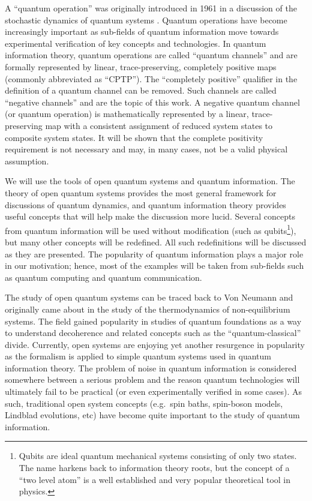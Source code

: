A ``quantum operation'' was originally introduced in 1961 in a discussion of the stochastic dynamics of quantum systems \cite{Sudarshan1961}.  Quantum operations have become increasingly important as sub-fields of quantum information move towards experimental verification of key concepts and technologies.  In quantum information theory, quantum operations are called ``quantum channels'' and are formally represented by linear, trace-preserving, completely positive maps (commonly abbreviated as ``CPTP'').  The ``completely positive'' qualifier in the definition of a quantum channel can be removed.  Such channels are called ``negative channels'' and are the topic of this work.  A negative quantum channel (or quantum operation) is mathematically represented by a linear, trace-preserving map with a consistent assignment of reduced system states to composite system states.  It will be shown that the complete positivity requirement is not necessary and may, in many cases, not be a valid physical assumption.  

We will use the tools of open quantum systems and quantum information.  The theory of open quantum systems provides the most general framework for discussions of quantum dynamics, and quantum information theory provides useful concepts that will help make the discussion more lucid.  Several concepts from quantum information will be used without modification (such as qubits\footnote{Qubits are ideal quantum mechanical systems consisting of only two states.  The name harkens back to information theory roots, but the concept of a ``two level atom'' is a well established and very popular theoretical tool in physics.}), but many other concepts will be redefined.  All such redefinitions will be discussed as they are presented.  The popularity of quantum information plays a major role in our motivation; hence, most of the examples will be taken from sub-fields such as quantum computing and quantum communication.

The study of open quantum systems can be traced back to Von Neumann \cite{vonNeumann1947} and originally came about in the study of the thermodynamics of non-equilibrium systems.  The field gained popularity in studies of quantum foundations as a way to understand decoherence and related concepts such as the ``quantum-classical'' divide.  Currently, open systems are enjoying yet another resurgence in popularity as the formalism is applied to simple quantum systems used in quantum information theory.  The problem of noise in quantum information is considered somewhere between a serious problem and the reason quantum technologies will ultimately fail to be practical (or even experimentally verified in some cases).  As such, traditional open system concepts (e.g.\ spin baths, spin-boson models, Lindblad evolutions, etc) have become quite important to the study of quantum information.

